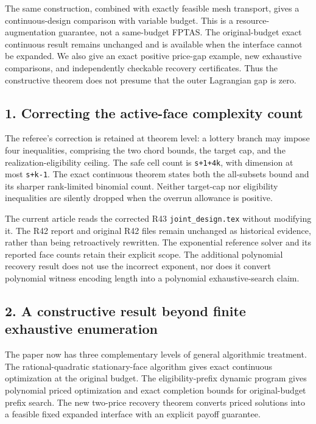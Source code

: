 \documentclass[11pt,letterpaper]{article}
\begin{document}
The same construction, combined with exactly feasible mesh transport, gives a continuous-design comparison with variable budget. This is a resource-augmentation guarantee, not a same-budget FPTAS. The original-budget exact continuous result remains unchanged and is available when the interface cannot be expanded. We also give an exact positive price-gap example, new exhaustive comparisons, and independently checkable recovery certificates. Thus the constructive theorem does not presume that the outer Lagrangian gap is zero.



\subsection*{1. Correcting the active-face complexity count}


The referee's correction is retained at theorem level: a lottery branch may impose four inequalities, comprising the two chord bounds, the target cap, and the realization-eligibility ceiling. The safe cell count is \nolinkurl{s+1+4k}, with dimension at most \nolinkurl{s+k-1}. The exact continuous theorem states both the all-subsets bound and its sharper rank-limited binomial count. Neither target-cap nor eligibility inequalities are silently dropped when the overrun allowance is positive.



The current article reads the corrected R43 \nolinkurl{joint_design.tex} without modifying it. The R42 report and original R42 files remain unchanged as historical evidence, rather than being retroactively rewritten. The exponential reference solver and its reported face counts retain their explicit scope. The additional polynomial recovery result does not use the incorrect exponent, nor does it convert polynomial witness encoding length into a polynomial exhaustive-search claim.



\subsection*{2. A constructive result beyond finite exhaustive enumeration}


The paper now has three complementary levels of general algorithmic treatment. The rational-quadratic stationary-face algorithm gives exact continuous optimization at the original budget. The eligibility-prefix dynamic program gives polynomial priced optimization and exact completion bounds for original-budget prefix search. The new two-price recovery theorem converts priced solutions into a feasible fixed expanded interface with an explicit payoff guarantee.
\end{document}
